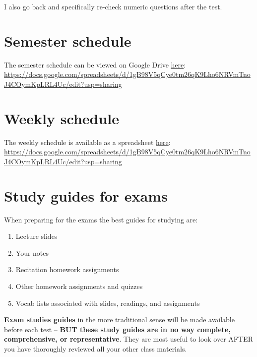 \documentclass[
]{book}
\providecommand{\tightlist}{%
  \setlength{\itemsep}{0pt}\setlength{\parskip}{0pt}}
\begin{document}
I also go back and specifically re-check numeric questions after the test.

\hypertarget{semester-schedule}{%
\chapter{Semester schedule}\label{semester-schedule}}

The semester schedule can be viewed on Google Drive \href{https://docs.google.com/spreadsheets/d/1gB98V5qCye0tm26qK9Lho6NRVmTnoJ4COymKpLRL4Uc/edit?usp=sharing}{here}:
\url{https://docs.google.com/spreadsheets/d/1gB98V5qCye0tm26qK9Lho6NRVmTnoJ4COymKpLRL4Uc/edit?usp=sharing}

\hypertarget{weekly-schedule}{%
\chapter{Weekly schedule}\label{weekly-schedule}}

The weekly schedule is available as a spreadsheet \href{https://docs.google.com/spreadsheets/d/1gB98V5qCye0tm26qK9Lho6NRVmTnoJ4COymKpLRL4Uc/edit?usp=sharing}{here}:
\url{https://docs.google.com/spreadsheets/d/1gB98V5qCye0tm26qK9Lho6NRVmTnoJ4COymKpLRL4Uc/edit?usp=sharing}

\hypertarget{study-guides-for-exams}{%
\chapter{Study guides for exams}\label{study-guides-for-exams}}

When preparing for the exams the best guides for studying are:

\begin{enumerate}
\def\labelenumi{\arabic{enumi}.}
\tightlist
\item
  Lecture slides
\item
  Your notes
\item
  Recitation homework assignments
\item
  Other homework assignments and quizzes
\item
  Vocab lists associated with slides, readings, and assignments
\end{enumerate}

\textbf{Exam studies guides} in the more traditional sense will be made available before each test -- \textbf{BUT these study guides are in no way complete, comprehensive, or representative}. They are most useful to look over AFTER you have thoroughly reviewed all your other class materials.
\end{document}
